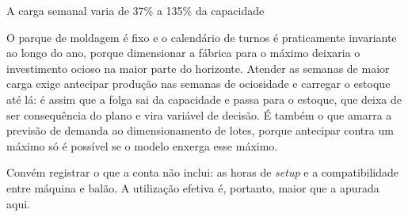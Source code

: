 \documentclass[11pt,aspectratio=169]{beamer}
\begin{document}
\begin{frame}{A carga semanal varia de 37\% a 135\% da capacidade}
{  O parque de moldagem é fixo e o calendário de turnos é praticamente invariante ao longo do ano,
  porque dimensionar a fábrica para o máximo deixaria o investimento ocioso na maior parte do
  horizonte. Atender as semanas de maior carga exige antecipar produção nas semanas de ociosidade
  e carregar o estoque até lá: é assim que a folga sai da capacidade e passa para o estoque, que
  deixa de ser consequência do plano e vira variável de decisão. É também o que amarra a previsão
  de demanda ao dimensionamento de lotes, porque antecipar contra um máximo só é possível se o
  modelo enxerga esse máximo.

  Convém registrar o que a conta não inclui: as horas de \textit{setup} e a compatibilidade entre
  máquina e balão. A utilização efetiva é, portanto, maior que a apurada aqui.}
\end{frame}
\end{document}
